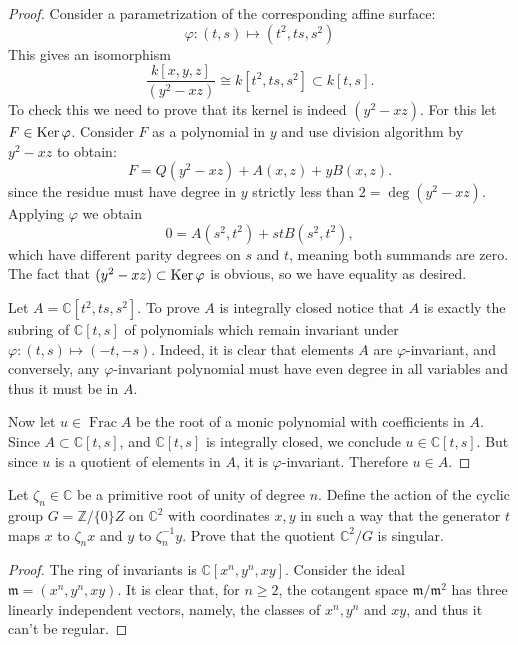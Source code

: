 \begin{proof}
Consider a parametrization of the
corresponding affine surface:
$$
\varphi:(t,s) \longmapsto (t^2,t s,s^2)
$$
This gives an isomorphism
$$
\frac{k[x,y,z]}{(y^2-xz)}
\cong
k[t^2,t s,s^2] \subset k[t,s].
$$
To check this we need to prove that its 
kernel is indeed $(y^2-xz)$.
For this let $F \in \mathop{\mathrm{Ker}} \varphi$.
Consider $F$ as a polynomial in $y$
and use division algorithm by
$y^2-xz$ to obtain:
$$
F=Q(y^2-xz)+A(x,z)+yB(x,z).
$$
since the residue must have degree in $y$
strictly less than
$2=\operatorname{deg}(y^2-xz)$. Applying
$\varphi$ we obtain
$$
0=A(s^2,t^2)+stB(s^2,t^2),
$$
which have different parity degrees
on $s$ and $t$, meaning both summands
are zero. The fact that $(y^2-xz) \subset
\mathop{\mathrm{Ker}}\varphi$ is obvious, so we have equality
as desired.

Let $A=\mathbb{C}[t^2,ts,s^2]$.
To prove $A$ is integrally closed
notice that $A$ is exactly the subring
of $\mathbb{C}[t,s]$ of polynomials which
remain invariant under
$\varphi:(t,s)\mapsto (-t,-s)$. Indeed,
it is clear that elements $A$ are 
$\varphi$-invariant, and conversely,
any $\varphi$-invariant polynomial
must have even degree in all variables
and thus it must be in $A$.

Now let $u \in \operatorname{Frac}A$
be the root of a monic polynomial
with coefficients in $A$.
Since $A \subset \mathbb{C}[t,s]$,
and $\mathbb{C}[t,s]$ is integrally closed,
we conclude $u \in \mathbb{C}[t,s]$.
But since $u$ is a quotient of elements
in $A$, it is $\varphi$-invariant.
Therefore $u \in A$.
\end{proof}

\begin{exercise}
\label{exercise-quotient-not-smooth}
Let $\zeta_n \in \mathbb{C}$
be a primitive root of unity
of degree $n$.
Define the action of the cyclic group
$G = \mathbb{Z}/\{0\}Z$ on $\mathbb{C}^2$
with coordinates $x,y$
in such a way that the generator
$t$ maps $x$ to $\zeta_nx$ and
$y$ to $\zeta_n^{-1}y$.
Prove that the quotient $\mathbb{C}^2/G$
is singular.
\end{exercise}

\begin{proof}
The ring of invariants is
$\mathbb{C}[x^n,y^n,xy]$.
Consider the ideal 
$\mathfrak{m}=(x^n,y^n,xy)$.
It is clear that, for $n\geq 2$,
the cotangent space
$\mathfrak{m}/\mathfrak{m}^2$
has three linearly independent vectors,
namely, the classes of
$x^n,y^n$ and $xy$, and thus it can't
be regular.
\end{proof}



